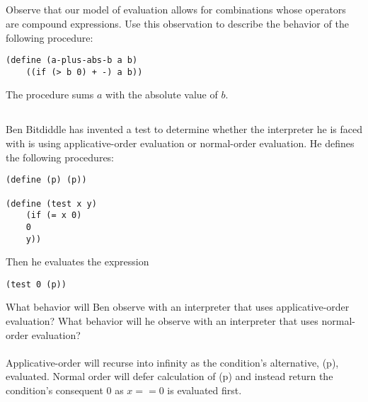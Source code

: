 \documentclass[fleqn]{article}
\begin{document}
\pagebreak
\subsection{}
Observe that our model of evaluation allows for combinations whose operators are compound expressions. Use this observation to describe the behavior of the following procedure:
\begin{lstlisting}
(define (a-plus-abs-b a b)
    ((if (> b 0) + -) a b))
\end{lstlisting}
The procedure sums $a$ with the absolute value of $b$.

\subsection{}
Ben Bitdiddle has invented a test to determine whether the interpreter he is faced with is using applicative-order evaluation or normal-order evaluation. He defines the following procedures:
\begin{lstlisting}
(define (p) (p))

(define (test x y)
    (if (= x 0)
    0
    y))
\end{lstlisting}
Then he evaluates the expression
\begin{lstlisting}
(test 0 (p))
\end{lstlisting}
What behavior will Ben observe with an interpreter that uses applicative-order evaluation? What behavior will he observe with an interpreter that uses normal-order evaluation?\\ \\
Applicative-order will recurse into infinity as the condition's alternative, (p), evaluated. Normal order will defer calculation of (p) and instead return the condition's consequent 0 as $x == 0$ is evaluated first.
\end{document}
